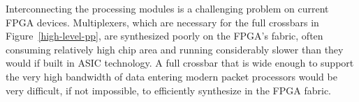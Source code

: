 

Interconnecting the processing modules is a challenging problem on current FPGA devices.
Multiplexers, which are necessary for the full crossbars in Figure~\ref{high-level-pp}, are synthesized poorly on the FPGA's fabric, often consuming relatively high chip area and running considerably slower than they would if built in ASIC technology.
A full crossbar that is wide enough to support the very high bandwidth of data entering modern packet processors would be very difficult, if not impossible, to efficiently synthesize in the FPGA fabric.


